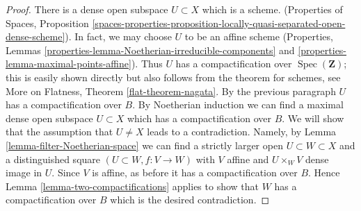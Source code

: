 \documentclass{stacks-project}
\theoremstyle{plain}
\theoremstyle{definition}
\theoremstyle{remark}
\numberwithin{equation}{subsection}
\def\Spec{\mathop{\mathrm{Spec}}}
\begin{document}
\begin{proof}
\medskip\noindent
There is a dense open subspace $U \subset X$ which is a scheme.
(Properties of Spaces, Proposition
\ref{spaces-properties-proposition-locally-quasi-separated-open-dense-scheme}).
In fact, we may choose $U$ to be an affine scheme
(Properties, Lemmas \ref{properties-lemma-Noetherian-irreducible-components}
and \ref{properties-lemma-maximal-points-affine}).
Thus $U$ has a compactification over $\Spec(\mathbf{Z})$;
this is easily shown directly but also follows from the
theorem for schemes, see
More on Flatness, Theorem \ref{flat-theorem-nagata}.
By the previous paragraph $U$ has a compactification over $B$. 
By Noetherian induction we can find a maximal dense open subspace
$U \subset X$ which has a compactification over $B$. We will show
that the assumption that $U \not = X$ leads to a contradiction.
Namely, by Lemma \ref{lemma-filter-Noetherian-space}
we can find a strictly larger open $U \subset W \subset X$
and a distinguished square $(U \subset W, f : V \to W)$
with $V$ affine and $U \times_W V$ dense image in $U$.
Since $V$ is affine, as before it has a compactification over $B$. Hence
Lemma \ref{lemma-two-compactifications}
applies to show that $W$ has a compactification over $B$
which is the desired contradiction.
\end{proof}









\end{document}
